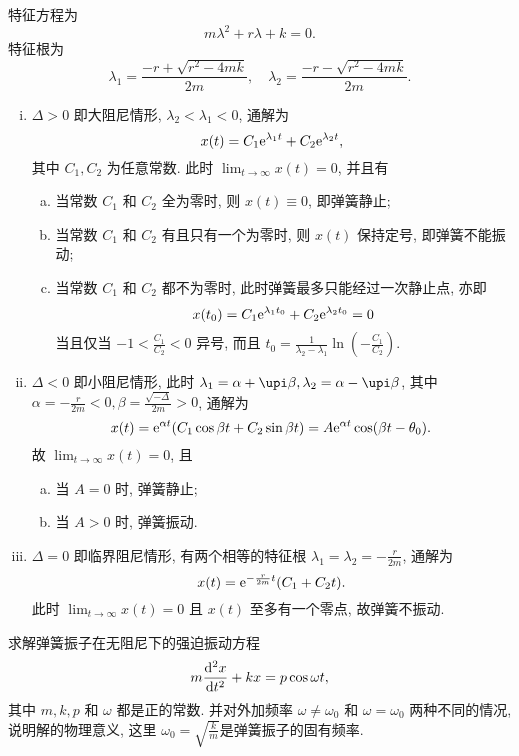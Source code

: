 \begin{solution}
  特征方程为
  \[m\lambda^2+r\lambda+k=0.\]
  特征根为
  \[\lambda_1=\frac{-r+\sqrt{r^2-4mk}}{2m},\quad\lambda_2=\frac{-r-\sqrt{r^2-4mk}}{2m}.\]
  \begin{enumerate}[(i)]
  \item $\Delta>0$ 即大阻尼情形, $\lambda_2<\lambda_1<0$, 通解为
  \[x(t)=C_1\mathrm{e}^{\lambda_1t}+C_2\mathrm{e}^{\lambda_2t},\]
  其中 $C_1,C_2$ 为任意常数. 此时 $\lim_{t\to\infty}x(t)=0$, 并且有
  \begin{enumerate}[(a)]
  \item 当常数 $C_1$ 和 $C_2$ 全为零时, 则 $x(t)\equiv 0$, 即弹簧静止;
  \item 当常数 $C_1$ 和 $C_2$ 有且只有一个为零时, 则 $x(t)$ 保持定号, 即弹簧不能振动;
  \item 当常数 $C_1$ 和 $C_2$ 都不为零时, 此时弹簧最多只能经过一次静止点, 亦即
  \[x(t_0)=C_1\mathrm{e}^{\lambda_1t_0}+C_2\mathrm{e}^{\lambda_2t_0}=0\]
  当且仅当 $-1<\frac{C_1}{C_2}<0$ 异号, 
  而且 $t_0=\frac{1}{\lambda_2-\lambda_1}\ln\left(-\frac{C_1}{C_2}\right)$.
  \end{enumerate}
  \item $\Delta<0$ 即小阻尼情形, 此时 $\lambda_1=\alpha+\upi\beta,\lambda_2=\alpha-\upi\beta$, 
  其中 $\alpha=-\frac{r}{2m}<0,\beta=\frac{\sqrt{-\Delta}}{2m}>0$, 通解为
  \[x(t)=\mathrm{e}^{\alpha t}(C_1\cos\beta t+C_2\sin\beta t)=A\mathrm{e}^{\alpha t}\cos(\beta t-\theta_0).\]
  故 $\lim_{t\to\infty}x(t)=0$, 且
  \begin{enumerate}[(a)]
  \item 当 $A=0$ 时, 弹簧静止;
  \item 当 $A>0$ 时, 弹簧振动.
  \end{enumerate}
  \item $\Delta=0$ 即临界阻尼情形, 有两个相等的特征根 $\lambda_1=\lambda_2=-\frac{r}{2m}$, 通解为
  \[x(t)=\mathrm{e}^{-\frac{r}{2m}t}(C_1+C_2t).\]
  此时 $\lim_{t\to\infty}x(t)=0$ 且 $x(t)$ 至多有一个零点, 故弹簧不振动.\qedhere
  \end{enumerate}
\end{solution}



\begin{exercise}
  求解弹簧振子在无阻尼下的强迫振动方程
  \[m\frac{\mathop{}\!\mathrm{d}^2x}{\mathop{}\!\mathrm{d} t^2}+kx=p\cos\omega t,\]
  其中 $m,k,p$ 和 $\omega$ 都是正的常数. 
  并对外加频率 $\omega\neq\omega_0$ 和 $\omega=\omega_0$ 两种不同的情况, 
  说明解的物理意义, 这里 $\omega_0=\sqrt{\frac{k}{m}}$是弹簧振子的固有频率.
\end{exercise}

